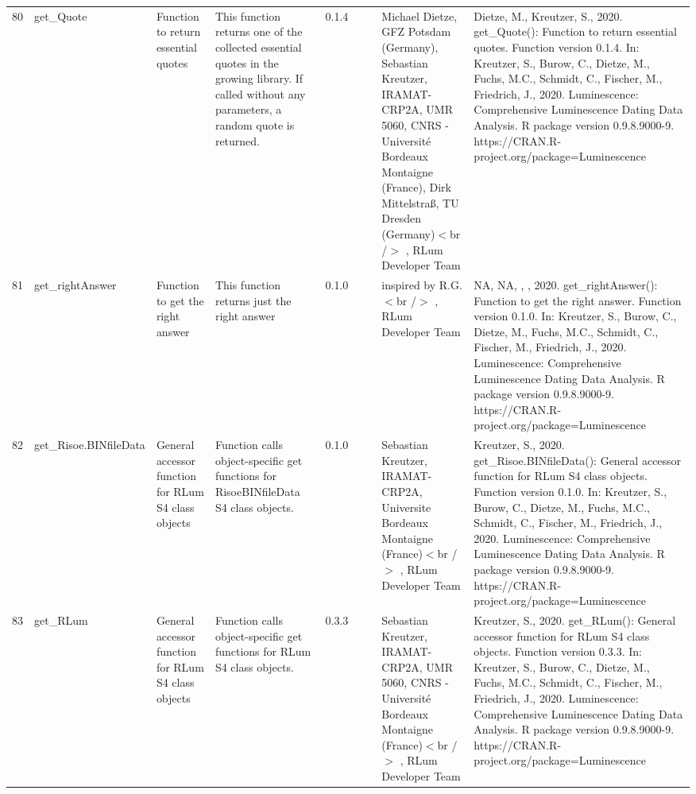 \begin{table}[ht]
\begin{tabular}{rllllllll}
 \\ 
  80 & get\_Quote & Function to return essential quotes & This function returns one of the collected essential quotes in the growing library. If called without any parameters, a random quote is returned. & 0.1.4
 &  &  & Michael Dietze, GFZ Potsdam (Germany), Sebastian Kreutzer, IRAMAT-CRP2A, UMR 5060, CNRS - Université Bordeaux Montaigne (France), Dirk Mittelstraß, TU Dresden (Germany)$<$br /$>$ , RLum Developer Team & Dietze, M., Kreutzer, S., 2020. get\_Quote(): Function to return essential quotes. Function version 0.1.4. In: Kreutzer, S., Burow, C., Dietze, M., Fuchs, M.C., Schmidt, C., Fischer, M., Friedrich, J., 2020. Luminescence: Comprehensive Luminescence Dating Data Analysis. R package version 0.9.8.9000-9. https://CRAN.R-project.org/package=Luminescence
 \\ 
  81 & get\_rightAnswer & Function to get the right answer & This function returns just the right answer & 0.1.0
 &  &  & inspired by R.G.$<$br /$>$ , RLum Developer Team & NA, NA, , , 2020. get\_rightAnswer(): Function to get the right answer. Function version 0.1.0. In: Kreutzer, S., Burow, C., Dietze, M., Fuchs, M.C., Schmidt, C., Fischer, M., Friedrich, J., 2020. Luminescence: Comprehensive Luminescence Dating Data Analysis. R package version 0.9.8.9000-9. https://CRAN.R-project.org/package=Luminescence
 \\ 
  82 & get\_Risoe.BINfileData & General accessor function for RLum S4 class objects & Function calls object-specific get functions for RisoeBINfileData S4 class objects. & 0.1.0
 &  &  & Sebastian Kreutzer, IRAMAT-CRP2A, Universite Bordeaux Montaigne (France)$<$br /$>$ , RLum Developer Team & Kreutzer, S., 2020. get\_Risoe.BINfileData(): General accessor function for RLum S4 class objects. Function version 0.1.0. In: Kreutzer, S., Burow, C., Dietze, M., Fuchs, M.C., Schmidt, C., Fischer, M., Friedrich, J., 2020. Luminescence: Comprehensive Luminescence Dating Data Analysis. R package version 0.9.8.9000-9. https://CRAN.R-project.org/package=Luminescence
 \\ 
  83 & get\_RLum & General accessor function for RLum S4 class objects & Function calls object-specific get functions for RLum S4 class objects. & 0.3.3
 &  &  & Sebastian Kreutzer, IRAMAT-CRP2A, UMR 5060, CNRS - Université Bordeaux Montaigne (France)$<$br /$>$ , RLum Developer Team & Kreutzer, S., 2020. get\_RLum(): General accessor function for RLum S4 class objects. Function version 0.3.3. In: Kreutzer, S., Burow, C., Dietze, M., Fuchs, M.C., Schmidt, C., Fischer, M., Friedrich, J., 2020. Luminescence: Comprehensive Luminescence Dating Data Analysis. R package version 0.9.8.9000-9. https://CRAN.R-project.org/package=Luminescence

\end{tabular}
\end{table}
